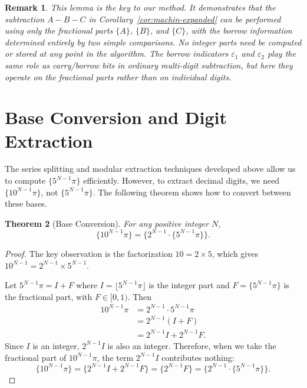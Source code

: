 \documentclass[11pt]{article}
\newtheorem{theorem}{Theorem}[section]
\newtheorem{remark}[theorem]{Remark}
\begin{document}
\begin{remark}
This lemma is the key to our method. It demonstrates that the subtraction $A - B - C$ in Corollary~\ref{cor:machin-expanded} can be performed using only the fractional parts $\{A\}$, $\{B\}$, and $\{C\}$, with the borrow information determined entirely by two simple comparisons. No integer parts need be computed or stored at any point in the algorithm. The borrow indicators $\varepsilon_1$ and $\varepsilon_2$ play the same role as carry/borrow bits in ordinary multi-digit subtraction, but here they operate on the fractional parts rather than on individual digits.
\end{remark}

\section{Base Conversion and Digit Extraction}

The series splitting and modular extraction techniques developed above allow us to compute $\{5^{N-1}\pi\}$ efficiently. However, to extract decimal digits, we need $\{10^{N-1}\pi\}$, not $\{5^{N-1}\pi\}$. The following theorem shows how to convert between these bases.

\begin{theorem}[Base Conversion]\label{thm:base-convert}
For any positive integer $N$,
\begin{equation}\label{eq:base-convert}
\{10^{N-1}\pi\} = \{2^{N-1} \cdot \{5^{N-1}\pi\}\}.
\end{equation}
\end{theorem}

\begin{proof}
The key observation is the factorization $10 = 2 \times 5$, which gives $10^{N-1} = 2^{N-1} \times 5^{N-1}$.

Let $5^{N-1}\pi = I + F$ where $I = \lfloor 5^{N-1}\pi \rfloor$ is the integer part and $F = \{5^{N-1}\pi\}$ is the fractional part, with $F \in [0,1)$. Then
\begin{align*}
10^{N-1}\pi &= 2^{N-1} \cdot 5^{N-1}\pi \\
&= 2^{N-1}(I + F) \\
&= 2^{N-1} I + 2^{N-1} F.
\end{align*}
Since $I$ is an integer, $2^{N-1} I$ is also an integer. Therefore, when we take the fractional part of $10^{N-1}\pi$, the term $2^{N-1} I$ contributes nothing:
\[
\{10^{N-1}\pi\} = \{2^{N-1} I + 2^{N-1} F\} = \{2^{N-1} F\} = \{2^{N-1} \cdot \{5^{N-1}\pi\}\}.
\]
\end{proof}
\end{document}
